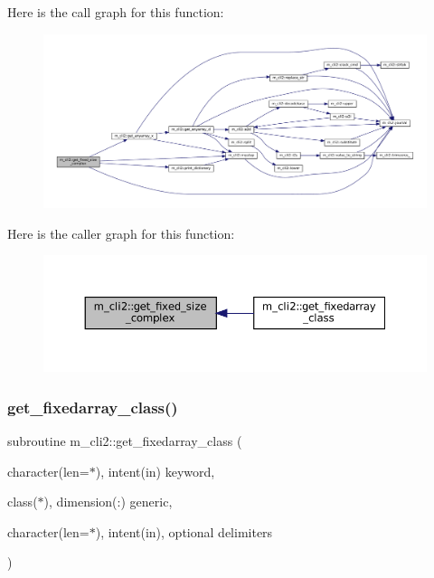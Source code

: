Here is the call graph for this function\+:
\nopagebreak
\begin{figure}[H]
\begin{center}
\leavevmode
\includegraphics[width=350pt]{namespacem__cli2_a32b78784e20e29bf40f17e16d08336fa_cgraph}
\end{center}
\end{figure}
Here is the caller graph for this function\+:\nopagebreak
\begin{figure}[H]
\begin{center}
\leavevmode
\includegraphics[width=350pt]{namespacem__cli2_a32b78784e20e29bf40f17e16d08336fa_icgraph}
\end{center}
\end{figure}
\mbox{\label{namespacem__cli2_a6d8c1c441ac15f9a2882e50459d39565}} 
\subsubsection{\texorpdfstring{get\+\_\+fixedarray\+\_\+class()}{get\_fixedarray\_class()}}
{\footnotesize\ttfamily subroutine m\+\_\+cli2\+::get\+\_\+fixedarray\+\_\+class (\begin{DoxyParamCaption}\item[{character(len=$\ast$), intent(in)}]{keyword,  }\item[{class($\ast$), dimension(\+:)}]{generic,  }\item[{character(len=$\ast$), intent(in), optional}]{delimiters }\end{DoxyParamCaption})\hspace{0.3cm}{\ttfamily [private]}}



